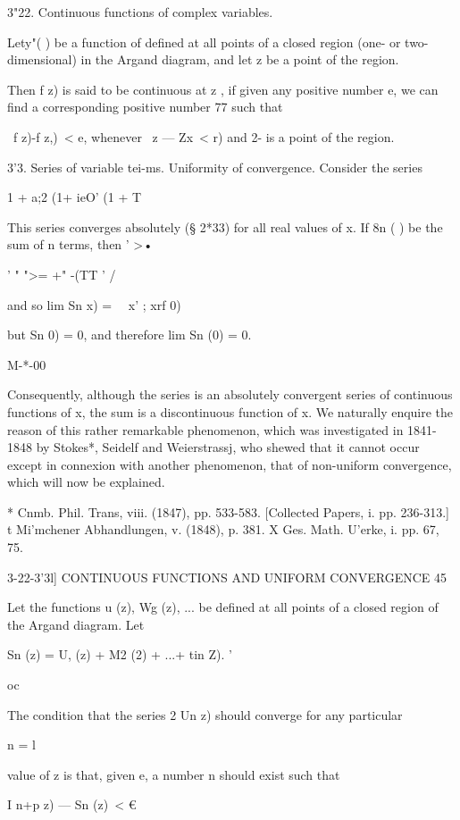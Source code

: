 3"22. Continuous functions of complex variables. 

Lety"( ) be a function of   defined at all points of a closed region (one- or 
two-dimensional) in the Argand diagram, and let z  be a point of the region. 

Then f z) is said to be continuous at z  , if given any positive number e, 
we can find a corresponding positive number 77 such that 

\ f z)-f z,)\ < e, 
whenever \ z — Zx\ < r) and 2- is a point of the region. 

3'3. Series of variable tei-ms. Uniformity of convergence. 
Consider the series 

  1 + a;2 (1+ ieO' (1 +  T 

This series converges absolutely (§ 2*33) for all real values of x. 
If 8n ( ) be the sum of n terms, then ' >• 

' " ">= +" -(TT '  / 

and so lim Sn  x) = \ \  x' ;  xrf 0) 

but Sn 0) = 0, and therefore lim Sn (0) = 0. 

M-*-00 

Consequently, although the series is an absolutely convergent series of 
continuous functions of x, the sum is a discontinuous function of x. We 
naturally enquire the reason of this rather remarkable phenomenon, which 
was investigated in 1841-1848 by Stokes*, Seidelf and Weierstrassj, who 
shewed that it cannot occur except in connexion with another phenomenon, 
that of non-uniform convergence, which will now be explained. 

* Cnmb. Phil. Trans, viii. (1847), pp. 533-583. [Collected Papers, i. pp. 236-313.] 
t Mi'mchener Abhandlungen, v. (1848), p. 381. 
X Ges. Math. U'erke, i. pp. 67, 75. 



3-22-3'3l] CONTINUOUS FUNCTIONS AND UNIFORM CONVERGENCE 45 

Let the functions u  (z), Wg (z), ... be defined at all points of a closed region 
of the Argand diagram. Let 

Sn (z) = U, (z) + M2 (2) + ...+ tin  Z). ' 

oc 

The condition that the series 2 Un  z) should converge for any particular 

n = l 

value of z is that, given e, a number n should exist such that 

I  n+p  z) — Sn (z)\ < € 

